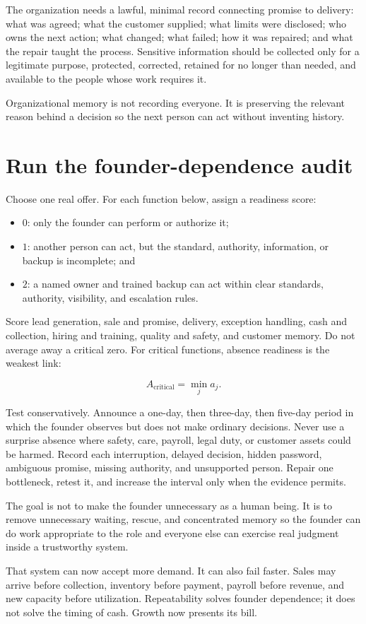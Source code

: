The organization needs a lawful, minimal record connecting promise to delivery:
what was agreed; what the customer supplied; what limits were disclosed; who
owns the next action; what changed; what failed; how it was repaired; and what
the repair taught the process. Sensitive information should be collected only
for a legitimate purpose, protected, corrected, retained for no longer than
needed, and available to the people whose work requires it.

Organizational memory is not recording everyone. It is preserving the relevant
reason behind a decision so the next person can act without inventing history.

\section{Run the founder-dependence audit}

Choose one real offer. For each function below, assign a readiness score:

\begin{itemize}[leftmargin=1.5em,itemsep=0.15em]
\item \(0\): only the founder can perform or authorize it;
\item \(1\): another person can act, but the standard, authority, information,
  or backup is incomplete; and
\item \(2\): a named owner and trained backup can act within clear standards,
  authority, visibility, and escalation rules.
\end{itemize}

Score lead generation, sale and promise, delivery, exception handling, cash and
collection, hiring and training, quality and safety, and customer memory. Do
not average away a critical zero. For critical functions, absence readiness is
the weakest link:

\begin{equation}
A_{\mathrm{critical}}=\min_j a_j.
\end{equation}

Test conservatively. Announce a one-day, then three-day, then five-day period
in which the founder observes but does not make ordinary decisions. Never use
a surprise absence where safety, care, payroll, legal duty, or customer assets
could be harmed. Record each interruption, delayed decision, hidden password,
ambiguous promise, missing authority, and unsupported person. Repair one
bottleneck, retest it, and increase the interval only when the evidence permits.

The goal is not to make the founder unnecessary as a human being. It is to
remove unnecessary waiting, rescue, and concentrated memory so the founder can
do work appropriate to the role and everyone else can exercise real judgment
inside a trustworthy system.

That system can now accept more demand. It can also fail faster. Sales may
arrive before collection, inventory before payment, payroll before revenue, and
new capacity before utilization. Repeatability solves founder dependence; it
does not solve the timing of cash. Growth now presents its bill.
